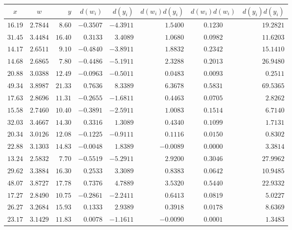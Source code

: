 \begin{tabular}{ccrrrrcr} \toprule
$x$     & $w$      & $y$     & $d(w_i)$  & $d(y_i)$  & $d(w_i)d(y_i)$ & $d(w_i)d(w_i)$ & $d(y_i)d(y_i)$ \\\midrule
$16.19$ & $2.7844$ & $8.60$  & $-0.3507$ & $-4.3911$ & $1.5400$      & $0.1230$       & $19.2821$ \\
$31.45$ & $3.4484$ & $16.40$ & $0.3133$  & $3.4089$  & $1.0680$      & $0.0982$       & $11.6203$ \\
$14.17$ & $2.6511$ & $9.10$  & $-0.4840$ & $-3.8911$ & $1.8832$      & $0.2342$       & $15.1410$ \\
$14.68$ & $2.6865$ & $7.80$  & $-0.4486$ & $-5.1911$ & $2.3288$      & $0.2013$       & $26.9480$ \\
$20.88$ & $3.0388$ & $12.49$ & $-0.0963$ & $-0.5011$ & $0.0483$      & $0.0093$       & $0.2511$  \\
$49.34$ & $3.8987$ & $21.33$ & $0.7636$  & $8.3389$  & $6.3678$      & $0.5831$       & $69.5365$ \\
$17.63$ & $2.8696$ & $11.31$ & $-0.2655$ & $-1.6811$ & $0.4463$      & $0.0705$       & $2.8262$  \\
$15.58$ & $2.7460$ & $10.40$ & $-0.3891$ & $-2.5911$ & $1.0083$      & $0.1514$       & $6.7140$  \\
$32.03$ & $3.4667$ & $14.30$ & $0.3316$  & $1.3089$  & $0.4340$      & $0.1099$       & $1.7131$  \\
$20.34$ & $3.0126$ & $12.08$ & $-0.1225$ & $-0.9111$ & $0.1116$      & $0.0150$       & $0.8302$  \\
$22.88$ & $3.1303$ & $14.83$ & $-0.0048$ & $1.8389$  & $-0.0089$     & $0.0000$       & $3.3814$  \\
$13.24$ & $2.5832$ & $7.70$  & $-0.5519$ & $-5.2911$ & $2.9200$      & $0.3046$       & $27.9962$ \\
$29.62$ & $3.3884$ & $16.30$ & $0.2533$  & $3.3089$  & $0.8383$      & $0.0642$       & $10.9485$ \\
$48.07$ & $3.8727$ & $17.78$ & $0.7376$  & $4.7889$  & $3.5320$      & $0.5440$       & $22.9332$ \\
$17.27$ & $2.8490$ & $10.75$ & $-0.2861$ & $-2.2411$ & $0.6413$      & $0.0819$       & $5.0227$  \\
$26.27$ & $3.2684$ & $15.93$ & $0.1333$  & $2.9389$  & $0.3918$      & $0.0178$       & $8.6369$  \\
$23.17$ & $3.1429$ & $11.83$ & $0.0078$  & $-1.1611$ & $-0.0090$     & $0.0001$       & $1.3483$  \\

\end{tabular}
